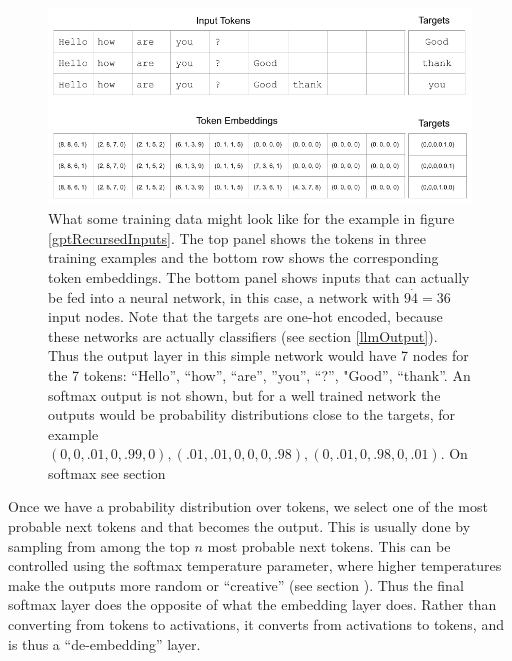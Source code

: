 \begin{figure}[h]
\centering
\includegraphics[scale=.45]{./images/contextWindow.png}
\caption[Jeff Yoshimi]{What some training data might look like for the example in figure \ref{gptRecursedInputs}. The top panel shows the tokens in three training examples and the bottom row shows the corresponding token embeddings. The bottom panel shows inputs that can actually be fed into a neural network, in this case, a network with $9 \dot 4 = 36$ input nodes. Note that the targets are one-hot encoded, because these networks are actually classifiers (see section \ref{llmOutput}). Thus the output layer in this simple network would have 7 nodes for the 7 tokens: ``Hello'', ``how'', ``are'', ''you'', ``?'', "Good'', ``thank''.  An softmax output is not shown, but for a well trained network the outputs would be probability distributions close to the targets, for example $(0,0,.01,0,.99,0),  (.01,.01,0,0,0,.98), (0,.01,0,.98,0,.01)$. On softmax see section }
\label{contextWindow}
\end{figure}

Once we have a probability distribution over tokens, we select one of the most probable next tokens and that becomes the output. This is usually done by sampling from among the top $n$ most probable next tokens. This can be controlled using the softmax temperature parameter, where higher temperatures make the outputs more random or ``creative'' (see section ). Thus the final softmax layer does the opposite of what the embedding layer does. Rather than converting from tokens to activations, it converts from activations to tokens, and is thus a ``de-embedding'' layer.

